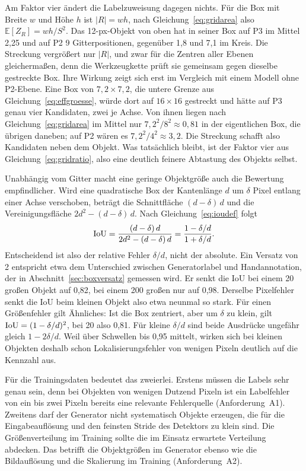 Am Faktor vier ändert die Labelzuweisung dagegen nichts. Für die Box mit
Breite $w$ und Höhe $h$ ist $|R| = wh$, nach Gleichung~\eqref{eq:gridarea} also
$\mathbb{E}[Z_R] = wh/S^2$. Das 12-px-Objekt von oben hat in seiner Box auf P3
im Mittel 2,25 und auf P2 9 Gitterpositionen, gegenüber 1,8 und 7,1 im Kreis.
Die Streckung vergrößert nur $|R|$, und zwar für die Zentren aller Ebenen
gleichermaßen, denn die Werkzeugkette prüft sie gemeinsam gegen dieselbe
gestreckte Box. Ihre Wirkung zeigt sich erst im Vergleich mit einem Modell
ohne P2-Ebene. Eine Box von $7{,}2\times7{,}2$\px, die untere Grenze aus
Gleichung~\eqref{eq:effgroesse}, würde dort auf $16\times16$\px{} gestreckt und
hätte auf P3 genau vier Kandidaten, zwei je Achse. Von ihnen liegen nach
Gleichung~\eqref{eq:gridarea} im Mittel nur $7{,}2^2/8^2 \approx 0{,}81$ in der
eigentlichen Box, die übrigen daneben; auf P2 wären es $7{,}2^2/4^2 \approx
3{,}2$. Die Streckung schafft also Kandidaten neben dem Objekt. Was tatsächlich
bleibt, ist der Faktor vier aus Gleichung~\eqref{eq:gridratio}, also eine
deutlich feinere Abtastung des Objekts selbst.

Unabhängig vom Gitter macht eine geringe Objektgröße auch die Bewertung
empfindlicher. Wird eine quadratische Box der Kantenlänge $d$ um $\delta$ Pixel
entlang einer Achse verschoben, beträgt die Schnittfläche $(d-\delta)\,d$ und
die Vereinigungsfläche $2d^{2}-(d-\delta)\,d$. Nach
Gleichung~\eqref{eq:ioudef} folgt
\begin{equation}
  \mathrm{IoU}
  =
  \frac{(d-\delta)\,d}{2d^{2}-(d-\delta)\,d}
  =
  \frac{1-\delta/d}{1+\delta/d}.
  \label{eq:ioushift}
\end{equation}
Entscheidend ist also der relative Fehler $\delta/d$, nicht der absolute. Ein
Versatz von 2\px{} entspricht etwa dem Unterschied zwischen Generatorlabel und
Handannotation, der in Abschnitt~\ref{sec:boxversatz} gemessen wird. Er senkt
die IoU bei einem 20\px{} großen Objekt auf 0,82, bei einem 200\px{} großen nur
auf 0,98. Derselbe Pixelfehler senkt die IoU beim kleinen Objekt also etwa
neunmal so stark. Für einen Größenfehler gilt Ähnliches: Ist die Box zentriert, aber um
$\delta$ zu klein, gilt $\mathrm{IoU} = (1-\delta/d)^{2}$, bei 20\px{} also 0,81. Für
kleine $\delta/d$ sind beide Ausdrücke ungefähr gleich $1 - 2\delta/d$. Weil
\mAPall{} über Schwellen bis 0,95 mittelt, wirken sich bei kleinen Objekten
deshalb schon Lokalisierungsfehler von wenigen Pixeln deutlich auf die Kennzahl
aus.

Für die Trainingsdaten bedeutet das zweierlei. Erstens müssen die Labels sehr
genau sein, denn bei Objekten von wenigen Dutzend Pixeln ist ein Labelfehler von
ein bis zwei Pixeln bereits eine relevante Fehlerquelle (Anforderung~A1).
Zweitens darf der Generator nicht systematisch Objekte erzeugen, die für die
Eingabeauflösung und den feinsten Stride des Detektors zu klein sind. Die
Größenverteilung im Training sollte die im Einsatz erwartete Verteilung
abdecken. Das betrifft die Objektgrößen im Generator ebenso wie die
Bildauflösung und die Skalierung im Training (Anforderung~A2).

